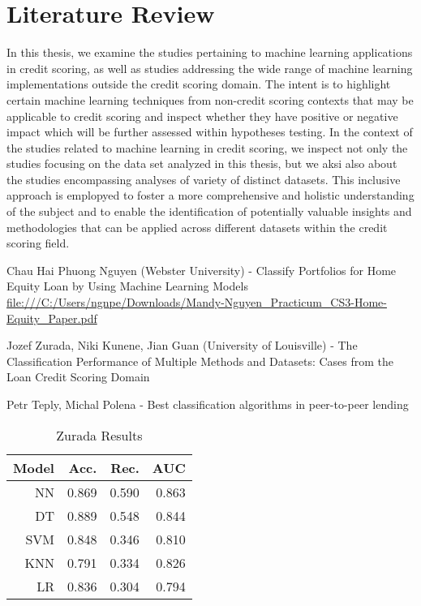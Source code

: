 \chapter{Literature Review}
\label{chap:three}

In this thesis, we examine the studies pertaining to machine learning applications in credit scoring, as well as studies addressing the wide range of machine learning implementations outside the credit scoring domain. The intent is to highlight certain machine learning techniques from non-credit scoring contexts that may be applicable to credit scoring and inspect whether they have positive or negative impact which will be further assessed within hypotheses testing.
In the context of the studies related to machine learning in credit scoring, we inspect not only the studies focusing on the data set analyzed in this thesis, but we aksi  also about the studies encompassing analyses of variety of distinct datasets.
This inclusive approach is emplopyed to foster a more comprehensive and holistic understanding of the subject and to enable the identification of potentially valuable insights and methodologies that can be applied across different datasets within the credit scoring field.

Chau Hai Phuong Nguyen (Webster University) - Classify Portfolios for Home Equity Loan by Using Machine Learning Models \url{file:///C:/Users/ngnpe/Downloads/Mandy-Nguyen_Practicum_CS3-Home-Equity_Paper.pdf}

Jozef Zurada, Niki Kunene, Jian Guan (University of Louisville) - The Classification Performance of Multiple Methods and
Datasets: Cases from the Loan Credit Scoring Domain

Petr Teply, Michal Polena - Best classification algorithms in peer-to-peer lending


\begin{table}[H]
    \small
    \setlength{\tabcolsep}{8pt}
    \renewcommand{\arraystretch}{1.3}
    \centering
    \caption[Zurada Results]{Zurada Results}\label{tab:zuradaresults}
    \begin{tabular}{r r r r}
    \toprule
    Model & Acc. & Rec. & AUC\\
    \midrule
    \hline
    NN & 0.869 & 0.590 & 0.863 \\
    DT & 0.889 & 0.548 & 0.844 \\
    SVM & 0.848 & 0.346 & 0.810 \\
    KNN & 0.791 & 0.334 & 0.826 \\
    LR & 0.836 & 0.304 & 0.794 \\
    \hline
    \bottomrule
    \end{tabular}
    \vspace{0.35em}
    
    \vspace{-1em}
\end{table}


